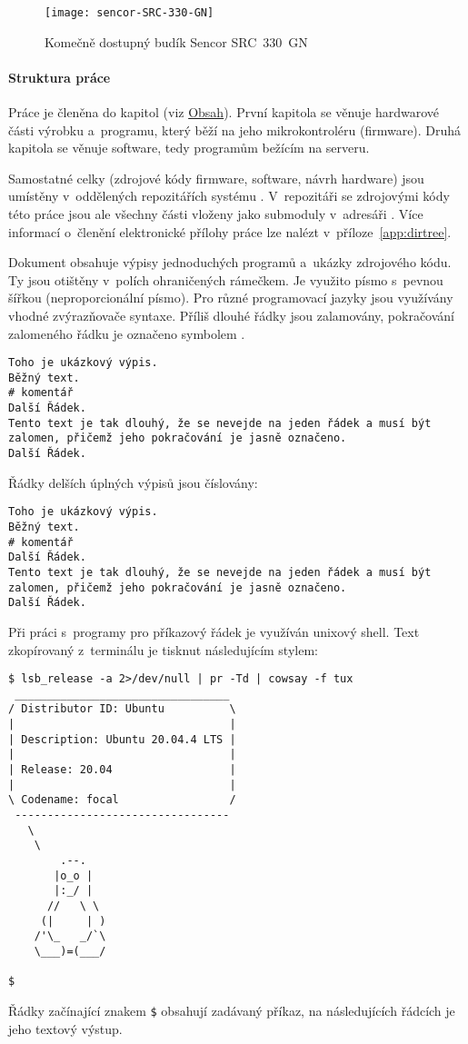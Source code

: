 \begin{figure}[htbp]
    \centering
    \texttt{[image: sencor-SRC-330-GN]}
    \caption{Komečně dostupný budík Sencor SRC~330~GN}
    \label{fig:sencor}
\end{figure}


\paragraph{Struktura práce}
Práce je členěna do kapitol (viz \hyperref[toc]{Obsah}). První kapitola se
věnuje hardwarové části výrobku a~programu, který běží na jeho mikrokontroléru
(firmware). Druhá kapitola se věnuje software, tedy programům bežícím na
serveru.

Samostatné celky (zdrojové kódy firmware, software, návrh hardware) jsou
umístěny v~oddělených repozitářích systému . V~repozitáři se
zdrojovými kódy této práce jsou ale všechny části vloženy jako submoduly
v~adresáři . Více informací o~členění elektronické přílohy
práce lze nalézt v~příloze~\vref{app:dirtree}.

Dokument obsahuje výpisy jednoduchých programů a~ukázky zdrojového kódu.
Ty jsou otištěny v~polích ohraničených rámečkem. Je využito písmo s~pevnou
šířkou (neproporcionální písmo). Pro různé programovací jazyky jsou využívány
vhodné zvýrazňovače syntaxe. Příliš dlouhé řádky jsou zalamovány, pokračování
zalomeného řádku je označeno symbolem \lstpostbreak{}.

\begin{lstlisting}[language=hashcomment]
Toho je ukázkový výpis.
Běžný text.
# komentář
Další Řádek.
Tento text je tak dlouhý, že se nevejde na jeden řádek a musí být zalomen, přičemž jeho pokračování je jasně označeno.
Další Řádek.
\end{lstlisting}

Řádky delších úplných výpisů jsou číslovány:
\begin{lstlisting}[language=hashcomment,style=numbers]
Toho je ukázkový výpis.
Běžný text.
# komentář
Další Řádek.
Tento text je tak dlouhý, že se nevejde na jeden řádek a musí být zalomen, přičemž jeho pokračování je jasně označeno.
Další Řádek.
\end{lstlisting}

Při práci s~programy pro příkazový řádek je využíván unixový shell.
Text zkopírovaný z~terminálu je tisknut následujícím stylem:
\begin{lstlisting}[style=terminal]
$ lsb_release -a 2>/dev/null | pr -Td | cowsay -f tux
 _________________________________
/ Distributor ID: Ubuntu          \
|                                 |
| Description: Ubuntu 20.04.4 LTS |
|                                 |
| Release: 20.04                  |
|                                 |
\ Codename: focal                 /
 ---------------------------------
   \
    \
        .--.
       |o_o |
       |:_/ |
      //   \ \
     (|     | )
    /'\_   _/`\
    \___)=(___/

$
\end{lstlisting}
Řádky začínající znakem \texttt{\$} obsahují zadávaný příkaz, na následujících
řádcích je jeho textový výstup.
